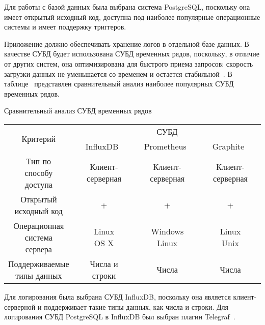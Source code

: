 Для работы с базой данных была выбрана система PostgreSQL, поскольку она имеет открытый исходный код, доступна под наиболее популярные операционные системы и имеет поддержку триггеров.

Приложение должно обеспечивать хранение логов в отдельной базе данных. В качестве СУБД будет использована СУБД временных рядов, поскольку, в отличие от других систем, она оптимизирована для быстрого приема запросов: скорость загрузки данных не уменьшается со временем и остается стабильной~\cite{timedb}. В таблице~\cite{time_dms_comp} представлен сравнительный анализ наиболее популярных СУБД временных рядов.

\begin{center}
	\begin{threeparttable}
		\captionsetup{justification=raggedright,singlelinecheck=off}
		\caption{\label{time_dms_comp}Сравнительный анализ СУБД временных рядов}
		\centering
		\begin{tabular}{|c|c|c|c|}
			\hline
			\multirow{2}{*}{Критерий} & \multicolumn{3}{|c|}{СУБД} \\
			\cline{2-4}
			& InfluxDB~\cite{influxdb} & Prometheus~\cite{prometheus} & Graphite~\cite{graphite} \\
			\hline
			\specialcell{Тип по\\способу\\доступа} & Клиент-серверная & Клиент-серверная & Клиент-серверная \\
			\hline
			\specialcell{Открытый\\исходный код} & + & + & + \\
			\hline
			\specialcell{Операционная\\система\\сервера} & \specialcell{Linux\\OS X} & \specialcell{Windows\\Linux} & \specialcell{Linux\\Unix} \\
			\hline
			\specialcell{Поддерживаемые\\типы данных} & Числа и строки & Числа & Числа \\
			\hline
		\end{tabular}
	\end{threeparttable}
\end{center}

Для логирования была выбрана СУБД InfluxDB, поскольку она является клиент-серверной и поддерживает такие типы данных, как числа и строки. Для логирования СУБД PostgreSQL в InfluxDB был выбран плагин Telegraf~\cite{telegraf}.

